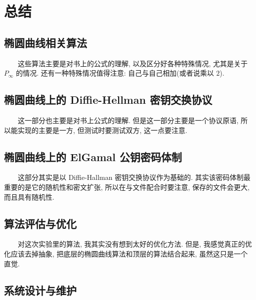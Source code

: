 \documentclass[12pt,a4paper]{article}
\begin{document}
\section*{总结}

\subsection*{椭圆曲线相关算法}

　　这些算法主要是对书上的公式的理解, 以及区分好各种特殊情况, 尤其是关于 $ P_{\infty} $ 的情况. 还有一种特殊情况值得注意: 自己与自己相加(或者说乘以 $ 2 $). 

\subsection*{椭圆曲线上的 Diffie-Hellman 密钥交换协议}

　　这一部分也主要是对书上公式的理解. 但是这一部分主要是一个协议原语, 所以能实现的主要是一方, 但测试时要测试双方, 这一点要注意. 

\subsection*{椭圆曲线上的 ElGamal 公钥密码体制}

　　这部分其实是以 Diffie-Hallman 密钥交换协议作为基础的. 其实该密码体制最重要的是它的随机性和密文扩张, 所以在与文件配合时要注意, 保存的文件会更大, 而且具有随机性. 

\subsection*{算法评估与优化}

　　对这次实验里的算法, 我其实没有想到太好的优化方法. 但是, 我感觉真正的优化应该去掉抽象, 把底层的椭圆曲线算法和顶层的算法结合起来, 虽然这只是一个直觉. 

\subsection*{系统设计与维护}
\end{document}

